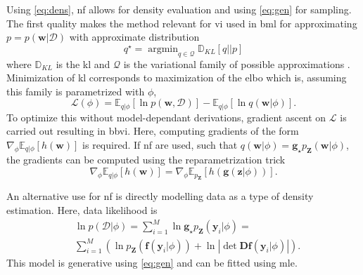 \documentclass[12pt,fleqn,twocolumn]{article}
\newcommand{\ginv}{\mathbf f}
\newcommand{\push}{\mathbf g_\star p_\mathbf Z}
\begin{document}
Using \eqref{eq:dens}, \acrshort{nf} allows for density evaluation and using \eqref{eq:gen} for sampling.
The first quality makes the method relevant for \acrfull{vi} used in \acrshort{bml} for approximating $p=p(\mathbf w | \mathcal D)$ with approximate distribution 
\begin{equation}
    q^\star = \operatorname{argmin}_{q\in \mathcal Q} \mathbb D_{KL}[q || p] 
\end{equation}
where $\mathbb D_{KL}$ is the \acrfull{kl} and $\mathcal Q$ is the variational family of possible approximations \cite{Blei2016VariationalIA}.
Minimization of \acrshort{kl} corresponds to maximization of the \acrfull{elbo} which is, assuming this family is parametrized with $\phi$,
\begin{equation}
    \mathcal L(\phi) = \mathbb E_{q|\phi}[\ln p(\mathbf w, \mathcal D)] - \mathbb E_{q|\phi}[\ln q(\mathbf w|\phi)].
\end{equation}
To optimize this without model-dependant derivations, gradient ascent on $\mathcal L$ is carried out resulting in \acrfull{bbvi}.
Here, computing gradients of the form $ \nabla_\phi \mathbb E_{q|\phi}[h(\mathbf w)]$ is required.
If \acrshort{nf} are used, such that $q(\mathbf w|\phi)=\push(\mathbf w| \phi)$, the gradients can be computed using the reparametrization trick \cite{JimenezRezende2015VariationalIW}
\begin{equation}
    \nabla_\phi \mathbb E_{q|\phi}[h(\mathbf w)]
    =
    \nabla_\phi \mathbb E_{p_\mathbf Z}[h(\mathbf g(\mathbf z | \phi))].
\end{equation}

An alternative use for \acrshort{nf} is directly modelling data as a type of density estimation.
Here, data likelihood is
\begin{align*}
    & \ln p (\mathcal D| \phi)  = \sum_{i=1}^M \ln \push(\mathbf y_i|\phi) = \\
    & \sum_{i=1}^M \left(
        \ln p_\mathbf Z(\ginv(\mathbf y_i|\phi)) + \ln \left| \det \mathbf D\ginv(\mathbf y_i|\phi)\right|
    \right).
\end{align*}
This model is generative using \eqref{eq:gen} and can be fitted using \acrfull{mle}.
\end{document}
